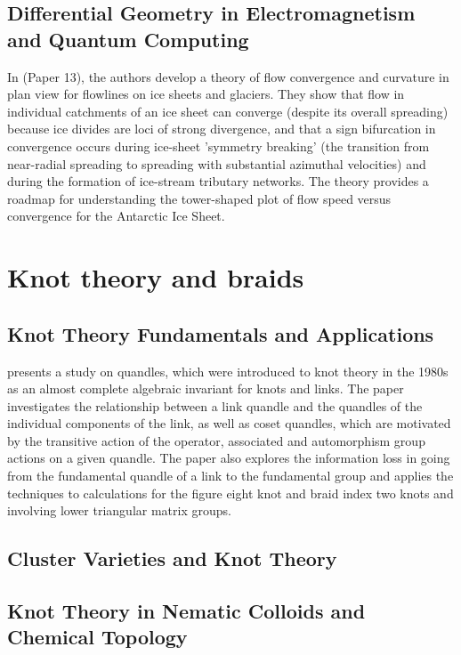 \documentclass{article}
\begin{document}
\subsection{Differential Geometry in Electromagnetism and Quantum Computing}

In (Paper 13), the authors develop a theory of flow convergence and curvature in plan view for flowlines on ice sheets and glaciers. They show that flow in individual catchments of an ice sheet can converge (despite its overall spreading) because ice divides are loci of strong divergence, and that a sign bifurcation in convergence occurs during ice-sheet 'symmetry breaking' (the transition from near-radial spreading to spreading with substantial azimuthal velocities) and during the formation of ice-stream tributary networks. The theory provides a roadmap for understanding the tower-shaped plot of flow speed versus convergence for the Antarctic Ice Sheet.


\section{Knot theory and braids}

\subsection{Knot Theory Fundamentals and Applications}

\cite{Budden2009KnotsAQ} presents a study on quandles, which were introduced to knot theory in the 1980s as an almost complete algebraic invariant for knots and links. The paper investigates the relationship between a link quandle and the quandles of the individual components of the link, as well as coset quandles, which are motivated by the transitive action of the operator, associated and automorphism group actions on a given quandle. The paper also explores the information loss in going from the fundamental quandle of a link to the fundamental group and applies the techniques to calculations for the figure eight knot and braid index two knots and involving lower triangular matrix groups.

\subsection{Cluster Varieties and Knot Theory}

\subsection{Knot Theory in Nematic Colloids and Chemical Topology}
\end{document}
